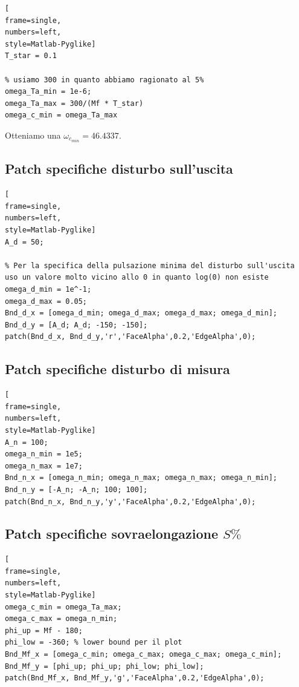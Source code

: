 \documentclass[a4paper, 11pt]{article}
\begin{document}
\begin{lstlisting}[
frame=single,
numbers=left,
style=Matlab-Pyglike]
T_star = 0.1

% usiamo 300 in quanto abbiamo ragionato al 5%
omega_Ta_min = 1e-6;
omega_Ta_max = 300/(Mf * T_star)
omega_c_min = omega_Ta_max
\end{lstlisting}

Otteniamo una $\omega_{c_{min}} = 46.4337$.

\subsection{\textbf{Patch specifiche disturbo sull'uscita}}


\begin{lstlisting}[
frame=single,
numbers=left,
style=Matlab-Pyglike]
A_d = 50;

% Per la specifica della pulsazione minima del disturbo sull'uscita uso un valore molto vicino allo 0 in quanto log(0) non esiste
omega_d_min = 1e^-1;
omega_d_max = 0.05;
Bnd_d_x = [omega_d_min; omega_d_max; omega_d_max; omega_d_min];
Bnd_d_y = [A_d; A_d; -150; -150];
patch(Bnd_d_x, Bnd_d_y,'r','FaceAlpha',0.2,'EdgeAlpha',0);

\end{lstlisting}

\subsection{\textbf{Patch specifiche disturbo di misura}}

\begin{lstlisting}[
frame=single,
numbers=left,
style=Matlab-Pyglike]
A_n = 100;
omega_n_min = 1e5;
omega_n_max = 1e7;
Bnd_n_x = [omega_n_min; omega_n_max; omega_n_max; omega_n_min];
Bnd_n_y = [-A_n; -A_n; 100; 100];
patch(Bnd_n_x, Bnd_n_y,'y','FaceAlpha',0.2,'EdgeAlpha',0);
\end{lstlisting}

\subsection{\textbf{Patch specifiche sovraelongazione $S\%$}}

\begin{lstlisting}[
frame=single,
numbers=left,
style=Matlab-Pyglike]
omega_c_min = omega_Ta_max;
omega_c_max = omega_n_min;
phi_up = Mf - 180;
phi_low = -360; % lower bound per il plot
Bnd_Mf_x = [omega_c_min; omega_c_max; omega_c_max; omega_c_min];
Bnd_Mf_y = [phi_up; phi_up; phi_low; phi_low];
patch(Bnd_Mf_x, Bnd_Mf_y,'g','FaceAlpha',0.2,'EdgeAlpha',0);

\end{lstlisting}
\end{document}
